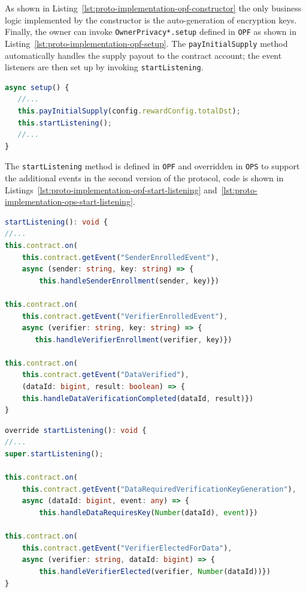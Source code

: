As shown in Listing~\ref{lst:proto-implementation-opf-constructor} the only business logic implemented by the constructor is the auto-generation of encryption keys.
Finally, the owner can invoke \lstinline{OwnerPrivacy*.setup} defined in \texttt{OPF} as shown in Listing~\ref{lst:proto-implementation-opf-setup}.
The \lstinline{payInitialSupply} method automatically handles the supply payout to the contract account; the event listeners are then set up by invoking \lstinline{startListening}.

\begin{lstlisting}[language=typescript, caption={\texttt{OPF}'s setup method, inherited from \texttt{OPS}},label={lst:proto-implementation-opf-setup}]
async setup() {
   //...
   this.payInitialSupply(config.rewardConfig.totalDst);
   this.startListening();
   //...
}
\end{lstlisting}

The \lstinline{startListening} method is defined in \texttt{OPF} and overridden in \texttt{OPS} to support the additional events in the second version of the protocol, code is shown in Listings~\ref{lst:proto-implementation-opf-start-listening} and~\ref{lst:proto-implementation-ops-start-listening}.

\begin{lstlisting}[language=typescript, caption={\texttt{OPF}'s startListening method},label={lst:proto-implementation-opf-start-listening}]
startListening(): void {
//...
this.contract.on(
    this.contract.getEvent("SenderEnrolledEvent"),
    async (sender: string, key: string) => {
        this.handleSenderEnrollment(sender, key)})

this.contract.on(
    this.contract.getEvent("VerifierEnrolledEvent"),
    async (verifier: string, key: string) => {
       this.handleVerifierEnrollment(verifier, key)})

this.contract.on(
    this.contract.getEvent("DataVerified"),
    (dataId: bigint, result: boolean) => {
    this.handleDataVerificationCompleted(dataId, result)})
}
\end{lstlisting}

\begin{lstlisting}[language=typescript, caption={\texttt{OPS}'s startListening method, uses the inherited method from parent class},label={lst:proto-implementation-ops-start-listening}]
override startListening(): void {
//...
super.startListening();

this.contract.on(
    this.contract.getEvent("DataRequiredVerificationKeyGeneration"),
    async (dataId: bigint, event: any) => {
        this.handleDataRequiresKey(Number(dataId), event)})

this.contract.on(
    this.contract.getEvent("VerifierElectedForData"),
    async (verifier: string, dataId: bigint) => {
        this.handleVerifierElected(verifier, Number(dataId))})
}
\end{lstlisting}


